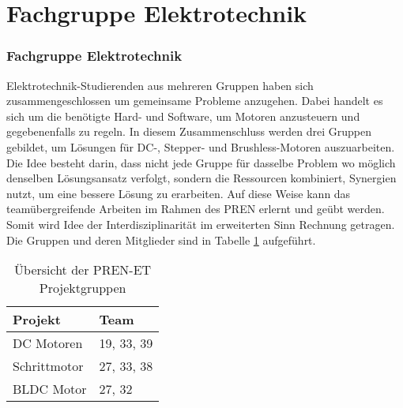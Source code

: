 \ifSTANDALONE
\section{Fachgruppe Elektrotechnik}
\fi
\ifEMBED
\subsubsection{Fachgruppe Elektrotechnik}
\label{chap:Fachgruppe Elektrotechnik}
\fi
Elektrotechnik-Studierenden aus mehreren Gruppen haben sich
zusammengeschlossen um gemeinsame Probleme anzugehen. Dabei handelt es sich
um die benötigte Hard- und Software, um Motoren anzusteuern
und gegebenenfalls zu regeln. In diesem Zusammenschluss werden drei Gruppen
gebildet, um Lösungen für DC-, Stepper- und Brushless-Motoren auszuarbeiten.
Die Idee besteht darin, dass nicht jede Gruppe für dasselbe Problem wo
möglich denselben Lösungsansatz verfolgt, sondern die Ressourcen kombiniert,
Synergien nutzt, um eine bessere Lösung zu erarbeiten. Auf diese Weise kann
das teamübergreifende Arbeiten im Rahmen des PREN erlernt und
geübt werden. Somit wird Idee der Interdisziplinarität im erweiterten Sinn
Rechnung getragen. Die Gruppen und deren Mitglieder sind in Tabelle 
\ref{tab:pren-et-overview} aufgeführt.
\begin{table}[h!]
	\centering
	\begin{tabular}{l l}
		 Projekt	 & Team \\\hline
		DC Motoren   & 19, 33, 39 \\
		Schrittmotor & 27, 33, 38 \\
		BLDC Motor	 & 27, 32 \\
	\end{tabular}
	\caption{Übersicht der PREN-ET Projektgruppen}
	\label{tab:pren-et-overview}
\end{table}
